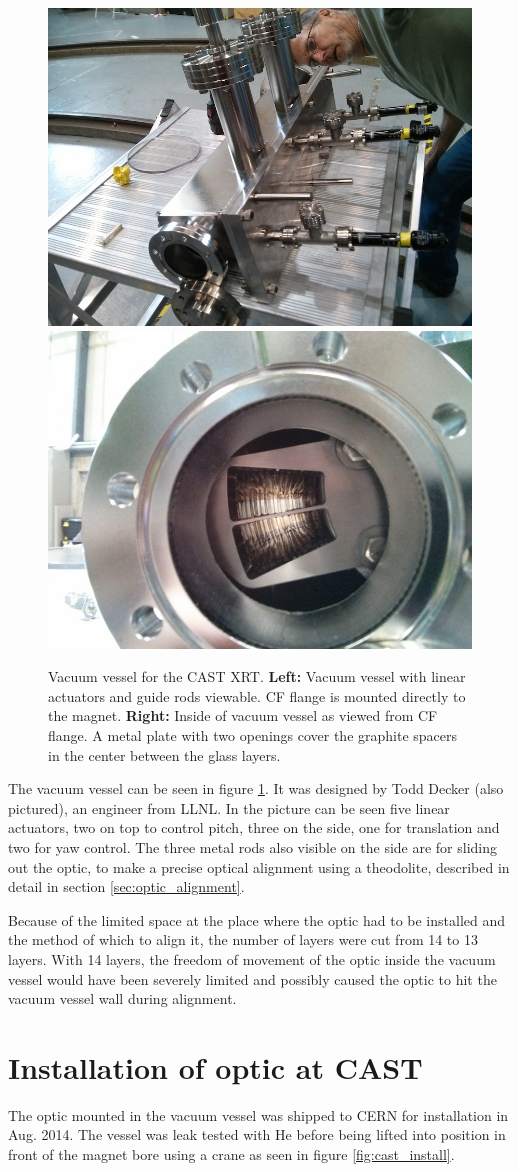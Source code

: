 \begin{figure}[htbp]
  \centering
    \includegraphics[width=0.45\linewidth]{figures/cast/cast_vessel1.jpg}
    \includegraphics[width=0.45\linewidth]{figures/cast/cast_vessel2.jpg}
  \caption{\footnotesize Vacuum vessel for the CAST XRT. \textbf{Left:} Vacuum vessel with linear actuators and guide rods viewable. CF flange is mounted directly to the magnet. \textbf{Right:} Inside of vacuum vessel as viewed from CF flange. A metal plate with two openings cover the graphite spacers in the center between the glass layers. }
  \label{fig:cast_vessel}
\end{figure}

The vacuum vessel can be seen in figure \ref{fig:cast_vessel}. It was designed by Todd Decker (also pictured), an engineer from LLNL. In the picture can be seen five linear actuators, two on top to control pitch, three on the side, one for translation and two for yaw control. The three metal rods also visible on the side are for sliding out the optic, to make a precise optical alignment using a theodolite, described in detail in section \ref{sec:optic_alignment}.

Because of the limited space at the place where the optic had to be installed and the method of which to align it, the number of layers were cut from 14 to 13 layers. With 14 layers, the freedom of movement of the optic inside the vacuum vessel would have been severely limited and possibly caused the optic to hit the vacuum vessel wall during alignment.

\section{Installation of optic at CAST}
The optic mounted in the vacuum vessel was shipped to CERN for installation in Aug. 2014. The vessel was leak tested with He before being lifted into position in front of the magnet bore using a crane as seen in figure \ref{fig:cast_install}.

